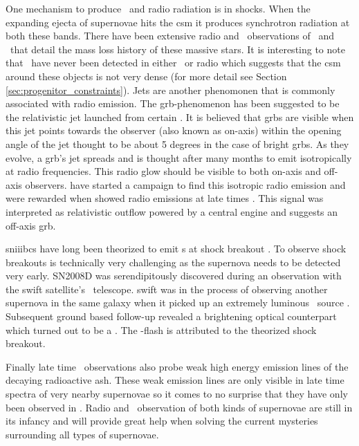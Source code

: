 One mechanism to produce \xray\ and radio radiation is in shocks. When the expanding ejecta of supernovae hits the \gls{csm}   it produces synchrotron radiation at both these bands. There have been extensive radio and \xray\ observations of \sneii\ and \sneibc\ that detail the mass loss history of these massive stars. It is interesting to note that \sneia\ have never been detected in either \xray\ or radio which suggests that the \gls{csm} around these objects is not very dense (for more detail see Section \ref{sec:progenitor_constraints}). Jets are another phenomonen that is commonly associated with radio emission. The \gls{grb}-phenomenon has been suggested to be the relativistic jet launched from certain \snibc. It is believed that \glspl{grb} are visible when this jet points towards the observer (also known as on-axis) within the opening angle of the jet thought to be about 5 degrees in the case of bright \glspl{grb}. As they evolve, a \gls{grb}'s jet spreads and is thought after many months to emit isotropically at radio frequencies. This radio glow should be visible to both on-axis and off-axis observers. \cite{2006ApJ...638..930S} have started a campaign to find this isotropic radio emission and were rewarded when  showed radio emissions at late times  \citep{2010Natur.463..513S}. This signal was interpreted as relativistic outflow powered by a central engine and suggests an off-axis \gls{grb}.

\glspl{sniiibc} have long been theorized to emit \xray s at shock breakout \citep{1978ApJ...223L.109K,1974ApJ...187..333C}. To observe shock breakouts is technically very challenging as the supernova needs to be detected very early. SN2008D was serendipitously discovered during an observation with the \gls{swift} satellite's \xray\ telescope. \gls{swift} was in the process of observing another supernova  in the same galaxy when it picked up an extremely luminous \xray\ source \cite{2008Natur.453..469S}. Subsequent ground based follow-up revealed a brightening optical counterpart which turned out to be a \snibc. The \xray-flash is attributed to the theorized shock breakout.

Finally late time \xray\ observations also probe weak high energy emission lines of the decaying radioactive ash. These weak emission lines are only visible in late time spectra of very nearby supernovae so it comes to no surprise that they have only been observed in  \citep{1987Natur.330..230S, 1987Natur.330..230D}. Radio and \xray\ observation of both kinds of supernovae are still in its infancy and will provide great help when solving the current mysteries surrounding all types of supernovae.

